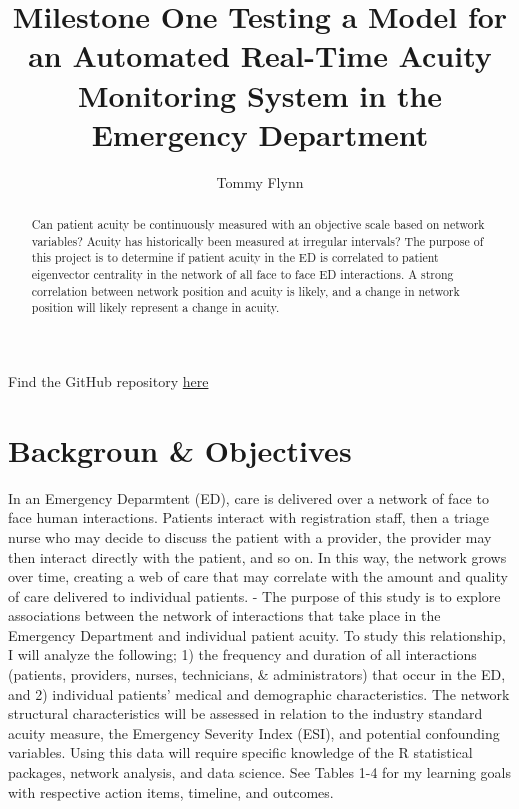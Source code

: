 \documentclass[]{elsarticle} %
\begin{document}
\begin{frontmatter}

  \title{Milestone One Testing a Model for an Automated Real-Time Acuity
Monitoring System in the Emergency Department}
    \author[Emory University]{Tommy Flynn}
      \address[Emory University]{Emory University Nell Hodgson School of Nursing, 1520 Clifton Road NE,
Atlanta, GA, 30322}
  
  \begin{abstract}
  Can patient acuity be continuously measured with an objective scale
  based on network variables? Acuity has historically been measured at
  irregular intervals? The purpose of this project is to determine if
  patient acuity in the ED is correlated to patient eigenvector centrality
  in the network of all face to face ED interactions. A strong correlation
  between network position and acuity is likely, and a change in network
  position will likely represent a change in acuity.
  \end{abstract}
  
 \end{frontmatter}

Find the GitHub repository
\href{https://github.com/tommyflynn/Project-Milestone-1.git}{here}

\section{Backgroun \& Objectives}\label{backgroun-objectives}

In an Emergency Deparmtent (ED), care is delivered over a network of
face to face human interactions. Patients interact with registration
staff, then a triage nurse who may decide to discuss the patient with a
provider, the provider may then interact directly with the patient, and
so on. In this way, the network grows over time, creating a web of care
that may correlate with the amount and quality of care delivered to
individual patients. - The purpose of this study is to explore
associations between the network of interactions that take place in the
Emergency Department and individual patient acuity. To study this
relationship, I will analyze the following; 1) the frequency and
duration of all interactions (patients, providers, nurses, technicians,
\& administrators) that occur in the ED, and 2) individual patients'
medical and demographic characteristics. The network structural
characteristics will be assessed in relation to the industry standard
acuity measure, the Emergency Severity Index (ESI), and potential
confounding variables. Using this data will require specific knowledge
of the R statistical packages, network analysis, and data science. See
Tables 1-4 for my learning goals with respective action items, timeline,
and outcomes.
\end{document}
